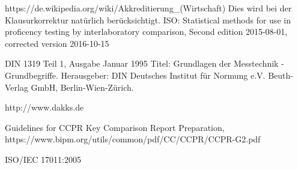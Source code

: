 \documentclass[a4paper,11pt]{book}
\begin{document}
\begin{flushleft}
\begin{thebibliography}{------}
     https://de.wikipedia.org/wiki/Akkreditierung\_(Wirtschaft)
 Dies wird bei der Klausurkorrektur natürlich berücksichtigt.
     ISO: Statistical methods for use in proficency testing by interlaboratory comparison, Second edition 2015-08-01, corrected version 2016-10-15

     DIN 1319 Teil 1, Ausgabe Januar 1995 Titel: Grundlagen der Messtechnik - Grundbegriffe. Herausgeber: DIN Deutsches Institut für Normung e.V. Beuth-Verlag GmbH, Berlin-Wien-Zürich.

     http://www.dakks.de

     Guidelines for CCPR Key Comparison Report
    Preparation, https://www.bipm.org/utils/common/pdf/CC/CCPR/CCPR-G2.pdf

    ISO/IEC 17011:2005
\end{thebibliography}
\end{flushleft}
\end{document}
